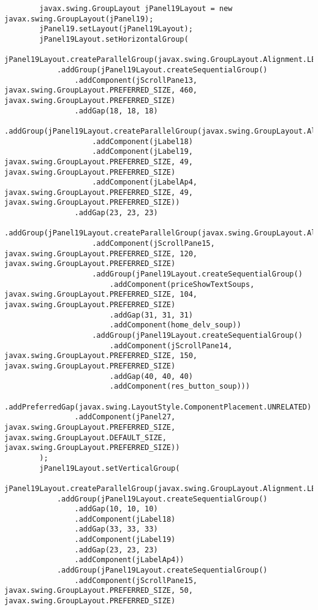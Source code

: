 \documentclass[12pt,a4paper]{article}
\begin{document}
\begin{lstlisting}
        javax.swing.GroupLayout jPanel19Layout = new javax.swing.GroupLayout(jPanel19);
        jPanel19.setLayout(jPanel19Layout);
        jPanel19Layout.setHorizontalGroup(
            jPanel19Layout.createParallelGroup(javax.swing.GroupLayout.Alignment.LEADING)
            .addGroup(jPanel19Layout.createSequentialGroup()
                .addComponent(jScrollPane13, javax.swing.GroupLayout.PREFERRED_SIZE, 460, javax.swing.GroupLayout.PREFERRED_SIZE)
                .addGap(18, 18, 18)
                .addGroup(jPanel19Layout.createParallelGroup(javax.swing.GroupLayout.Alignment.LEADING)
                    .addComponent(jLabel18)
                    .addComponent(jLabel19, javax.swing.GroupLayout.PREFERRED_SIZE, 49, javax.swing.GroupLayout.PREFERRED_SIZE)
                    .addComponent(jLabelAp4, javax.swing.GroupLayout.PREFERRED_SIZE, 49, javax.swing.GroupLayout.PREFERRED_SIZE))
                .addGap(23, 23, 23)
                .addGroup(jPanel19Layout.createParallelGroup(javax.swing.GroupLayout.Alignment.LEADING)
                    .addComponent(jScrollPane15, javax.swing.GroupLayout.PREFERRED_SIZE, 120, javax.swing.GroupLayout.PREFERRED_SIZE)
                    .addGroup(jPanel19Layout.createSequentialGroup()
                        .addComponent(priceShowTextSoups, javax.swing.GroupLayout.PREFERRED_SIZE, 104, javax.swing.GroupLayout.PREFERRED_SIZE)
                        .addGap(31, 31, 31)
                        .addComponent(home_delv_soup))
                    .addGroup(jPanel19Layout.createSequentialGroup()
                        .addComponent(jScrollPane14, javax.swing.GroupLayout.PREFERRED_SIZE, 150, javax.swing.GroupLayout.PREFERRED_SIZE)
                        .addGap(40, 40, 40)
                        .addComponent(res_button_soup)))
                .addPreferredGap(javax.swing.LayoutStyle.ComponentPlacement.UNRELATED)
                .addComponent(jPanel27, javax.swing.GroupLayout.PREFERRED_SIZE, javax.swing.GroupLayout.DEFAULT_SIZE, javax.swing.GroupLayout.PREFERRED_SIZE))
        );
        jPanel19Layout.setVerticalGroup(
            jPanel19Layout.createParallelGroup(javax.swing.GroupLayout.Alignment.LEADING)
            .addGroup(jPanel19Layout.createSequentialGroup()
                .addGap(10, 10, 10)
                .addComponent(jLabel18)
                .addGap(33, 33, 33)
                .addComponent(jLabel19)
                .addGap(23, 23, 23)
                .addComponent(jLabelAp4))
            .addGroup(jPanel19Layout.createSequentialGroup()
                .addComponent(jScrollPane15, javax.swing.GroupLayout.PREFERRED_SIZE, 50, javax.swing.GroupLayout.PREFERRED_SIZE)

\end{lstlisting}
\end{document}
